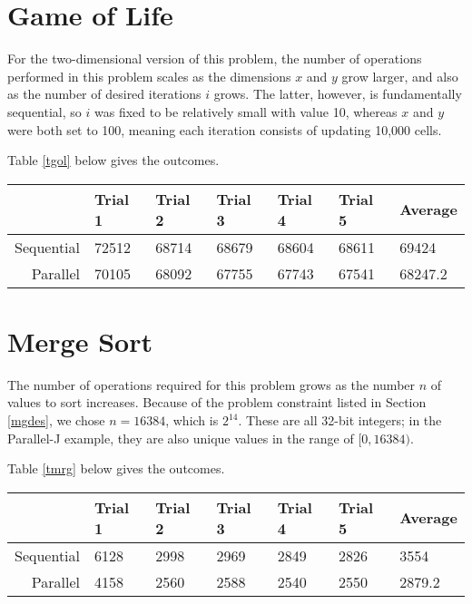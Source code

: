 \section{Game of Life}
For the two-dimensional version of this problem, 
the number of operations performed in this problem scales 
as the dimensions $x$ and $y$ grow larger, 
and also as the number of desired iterations $i$ grows. 
The latter, however, is fundamentally sequential, 
so $i$ was fixed to be relatively small with value 10, 
whereas $x$ and $y$ were both set to 100, 
meaning each iteration consists of updating 10,000 cells.

Table \ref{tgol} below gives the outcomes.

\begin{center}
\begin{tabular}{|r|l|l|l|l|l||l|}
\label{tgol}
	           & Trial 1 & Trial 2 & Trial 3 & Trial 4 & Trial 5 & Average \\ \hline
	Sequential & 72512   & 68714   & 68679   & 68604   & 68611   & 69424   \\ \hline
	Parallel   & 70105   & 68092   & 67755   & 67743   & 67541   & 68247.2 \\ \hline
\end{tabular}
\end{center}

\section{Merge Sort}
The number of operations required for this problem 
grows as the number $n$ of values to sort increases. 
Because of the problem constraint listed in Section \ref{mgdes}, 
we chose $n=16384$, which is $2^{14}$.
These are all 32-bit integers; 
in the Parallel-J example, they are also unique values 
in the range of $[0,16384)$. 

Table \ref{tmrg} below gives the outcomes.

\begin{center}
\begin{tabular}{|r|l|l|l|l|l||l|}
\label{tmrg}
			   & Trial 1 & Trial 2 & Trial 3 & Trial 4 & Trial 5 & Average \\ \hline
	Sequential & 6128    & 2998    & 2969    & 2849    & 2826    & 3554    \\ \hline
	Parallel   & 4158    & 2560    & 2588    & 2540    & 2550    & 2879.2  \\ \hline
\end{tabular}
\end{center}
